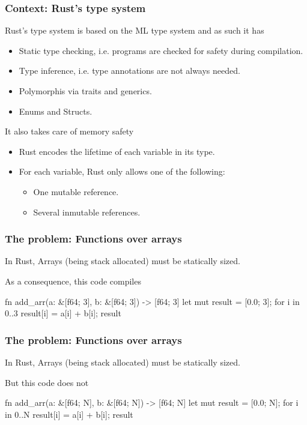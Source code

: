 \documentclass{beamer}
\begin{document}
\begin{frame}[fragile]
    \frametitle{Context: Rust's type system}
    Rust's type system is based on the ML type system and as such it has
    \begin{itemize}
        \item Static type checking, i.e. programs are checked for safety during compilation.
        \item Type inference, i.e. type annotations are not always needed.
        \item Polymorphis via traits and generics.
        \item Enums and Structs.
    \end{itemize}
    It also takes care of memory safety
    \begin{itemize}
        \item Rust encodes the lifetime of each variable in its type.
        \item For each variable, Rust only allows one of the following:
            \begin{itemize}
                \item One mutable reference.
                \item Several inmutable references.
            \end{itemize}
    \end{itemize}
\end{frame}

\begin{frame}[fragile]
    \frametitle{The problem: Functions over arrays}
    In Rust, Arrays (being stack allocated) must be statically sized.

    As a consequence, this code compiles
    \begin{rustcode}
    fn add_arr(a: &[f64; 3], b: &[f64; 3]) -> [f64; 3] {
        let mut result = [0.0; 3];
        for i in 0..3 {
            result[i] = a[i] + b[i];
        }
        result
    }
    \end{rustcode}
\end{frame}

\begin{frame}[fragile]
    \frametitle{The problem: Functions over arrays}
    In Rust, Arrays (being stack allocated) must be statically sized.

    But this code does not
    \begin{rustcode}
    fn add_arr(a: &[f64; N], b: &[f64; N]) -> [f64; N] {
        let mut result = [0.0; N];
        for i in 0..N {
            result[i] = a[i] + b[i];
        }
        result
    }
    \end{rustcode}
\end{frame}
\end{document}
